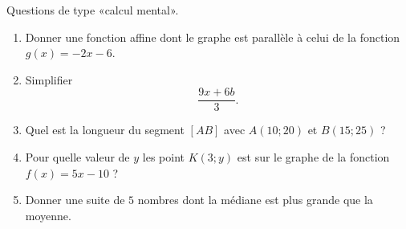 
\begin{exercice}\label{exosmath-0674}

    Questions de type «calcul mental».
    \begin{multicols}{2}
        \begin{enumerate}
            \item
                Donner une fonction affine dont le graphe est parallèle à celui de la fonction \( g(x)=-2x-6\).
            \item
                Simplifier
                \begin{equation*}
                    \frac{ 9x+6b }{ 3 }.
                \end{equation*}
            \item
                Quel est la longueur du segment \( [AB]\) avec \( A(10;20)\) et \( B(15;25)\) ?
            \item
                Pour quelle valeur de \( y\) les point \( K(3;y)\) est sur le graphe de la fonction \( f(x)=5x-10\) ?
            \item
                Donner une suite de \( 5\) nombres dont la médiane est plus grande que la moyenne.
        \end{enumerate}
    \end{multicols}

\end{exercice}
